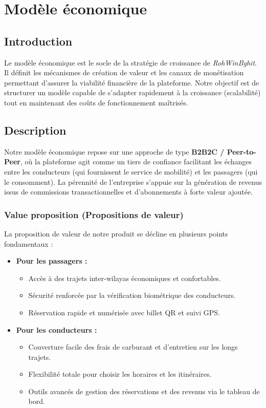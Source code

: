 \section{Modèle économique}

\subsection{Introduction}

Le modèle économique est le socle de la stratégie de croissance de \textit{RohWinBghit}. Il définit les mécanismes de création de valeur et les canaux de monétisation permettant d'assurer la viabilité financière de la plateforme. Notre objectif est de structurer un modèle capable de s'adapter rapidement à la croissance (scalabilité) tout en maintenant des coûts de fonctionnement maîtrisés.

\subsection{Description}

Notre modèle économique repose sur une approche de type \textbf{B2B2C / Peer-to-Peer}, où la plateforme agit comme un tiers de confiance facilitant les échanges entre les conducteurs (qui fournissent le service de mobilité) et les passagers (qui le consomment). La pérennité de l'entreprise s'appuie sur la génération de revenus issus de commissions transactionnelles et d'abonnements à forte valeur ajoutée.

\subsubsection{Value proposition (Propositions de valeur)}

La proposition de valeur de notre produit se décline en plusieurs points fondamentaux :
\begin{itemize}
    \item \textbf{Pour les passagers :} 
    \begin{itemize}[label=$\circ$]
        \item Accès à des trajets inter-wilayas économiques et confortables.
        \item Sécurité renforcée par la vérification biométrique des conducteurs.
        \item Réservation rapide et numérisée avec billet QR et suivi GPS.
    \end{itemize}
    \item \textbf{Pour les conducteurs :}
    \begin{itemize}[label=$\circ$]
        \item Couverture facile des frais de carburant et d'entretien sur les longs trajets.
        \item Flexibilité totale pour choisir les horaires et les itinéraires.
        \item Outils avancés de gestion des réservations et des revenus via le tableau de bord.
    \end{itemize}
\end{itemize}

